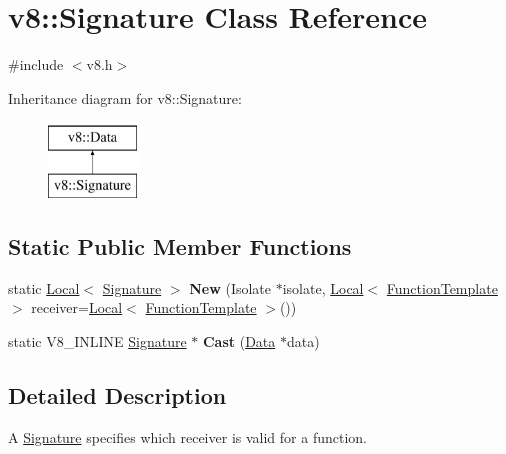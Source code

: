 \hypertarget{classv8_1_1Signature}{}\section{v8\+:\+:Signature Class Reference}
\label{classv8_1_1Signature}


{\ttfamily \#include $<$v8.\+h$>$}

Inheritance diagram for v8\+:\+:Signature\+:\begin{figure}[H]
\begin{center}
\leavevmode
\includegraphics[height=2.000000cm]{classv8_1_1Signature}
\end{center}
\end{figure}
\subsection*{Static Public Member Functions}
\begin{DoxyCompactItemize}
\item 
\mbox{\label{classv8_1_1Signature_abdc9d0abab0e564ed667045e13beeb3e}} 
static \mbox{\hyperlink{classv8_1_1Local}{Local}}$<$ \mbox{\hyperlink{classv8_1_1Signature}{Signature}} $>$ {\bfseries New} (Isolate $\ast$isolate, \mbox{\hyperlink{classv8_1_1Local}{Local}}$<$ \mbox{\hyperlink{classv8_1_1FunctionTemplate}{Function\+Template}} $>$ receiver=\mbox{\hyperlink{classv8_1_1Local}{Local}}$<$ \mbox{\hyperlink{classv8_1_1FunctionTemplate}{Function\+Template}} $>$())
\item 
\mbox{\label{classv8_1_1Signature_a9c7566555923187ca55c14af8048a9fc}} 
static V8\+\_\+\+I\+N\+L\+I\+NE \mbox{\hyperlink{classv8_1_1Signature}{Signature}} $\ast$ {\bfseries Cast} (\mbox{\hyperlink{classv8_1_1Data}{Data}} $\ast$data)
\end{DoxyCompactItemize}


\subsection{Detailed Description}
A \mbox{\hyperlink{classv8_1_1Signature}{Signature}} specifies which receiver is valid for a function.

